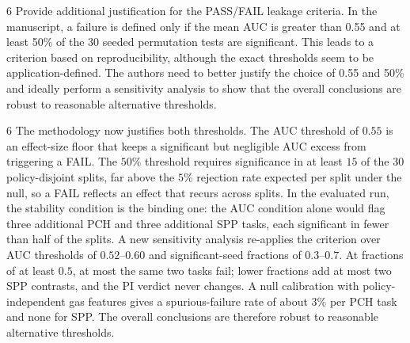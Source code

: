 \begin{reviewcomment}{6}
	Provide additional justification for the PASS/FAIL leakage criteria.
	In the manuscript, a failure is defined only if the mean AUC is greater than 0.55 and at least 50\% of the 30 seeded permutation tests are significant.
	This leads to a criterion based on reproducibility, although the exact thresholds seem to be application-defined.
	The authors need to better justify the choice of 0.55 and 50\% and ideally perform a sensitivity analysis to show that the overall conclusions are robust to reasonable alternative thresholds.
\end{reviewcomment}

\begin{reviewresponse}{6}
	The methodology now justifies both thresholds.
	The AUC threshold of $0.55$ is an effect-size floor that keeps a significant but negligible AUC excess from triggering a FAIL.
	The $50\%$ threshold requires significance in at least $15$ of the $30$ policy-disjoint splits, far above the $5\%$ rejection rate expected per split under the null, so a FAIL reflects an effect that recurs across splits.
	In the evaluated run, the stability condition is the binding one: the AUC condition alone would flag three additional PCH and three additional SPP tasks, each significant in fewer than half of the splits.
	A new sensitivity analysis re-applies the criterion over AUC thresholds of $0.52$--$0.60$ and significant-seed fractions of $0.3$--$0.7$.
	At fractions of at least $0.5$, at most the same two tasks fail; lower fractions add at most two SPP contrasts, and the PI verdict never changes.
	A null calibration with policy-independent gas features gives a spurious-failure rate of about $3\%$ per PCH task and none for SPP.
	The overall conclusions are therefore robust to reasonable alternative thresholds.

\end{reviewresponse}
